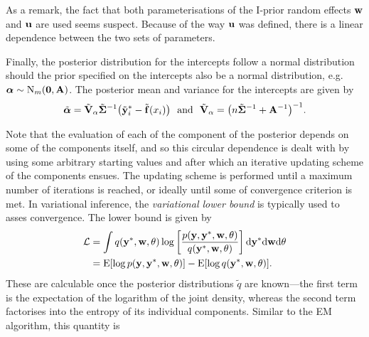 As a remark, the fact that both parameterisations of the I-prior random effects ${\mathbf w}$ and ${\mathbf u}$ are used seems suspect. 
Because of the way ${\mathbf u}$ was defined, there is a linear dependence between the two sets of parameters.

Finally, the posterior distribution for the intercepts follow a normal distribution should the prior specified on the intercepts also be a normal distribution, e.g. ${\bm\alpha} \sim \operatorname{N}_m({\mathbf 0},{\mathbf A})$.
The posterior mean and variance for the intercepts are given by
\[
  \tilde{{\bm\alpha}} = \tilde{{\mathbf V}}_\alpha \tilde{{\bm\Sigma}}^{-1}\big(\tilde{{\mathbf y}}_i^* - \tilde{{\mathbf f}}(x_i)\big) \ \text{ and } \ \tilde{{\mathbf V}}_\alpha = \big(n\tilde{{\bm\Sigma}}^{-1} + {\mathbf A}^{-1}\big)^{-1}.
\]

Note that the evaluation of each of the component of the posterior depends on some of the components itself, and so this circular dependence is dealt with by using some arbitrary starting values and after which an iterative updating scheme of the components ensues.
The updating scheme is performed until a maximum number of iterations is reached, or ideally until some of convergence criterion is met.
In variational inference, the \emph{variational lower bound} is typically used to asses convergence.
The lower bound is given by
\begin{align*}
  {\mathcal L} 
  &= \int q({\mathbf y}^*,{\mathbf w},\theta) \log \left[ \frac{p({\mathbf y},{\mathbf y}^*,{\mathbf w},\theta)}{q({\mathbf y}^*,{\mathbf w},\theta)} \right] \text{d}{\mathbf y}^* \text{d}{\mathbf w} \text{d}\theta \\
  &= \operatorname{E}[\log p({\mathbf y},{\mathbf y}^*,{\mathbf w},\theta)] - \operatorname{E}[\log q({\mathbf y}^*,{\mathbf w},\theta)].
\end{align*}
These are calculable once the posterior distributions $\tilde q$ are known---the first term is the expectation of the logarithm of the joint density, whereas the second term factorises into the entropy of its individual components.
Similar to the EM algorithm, this quantity is


